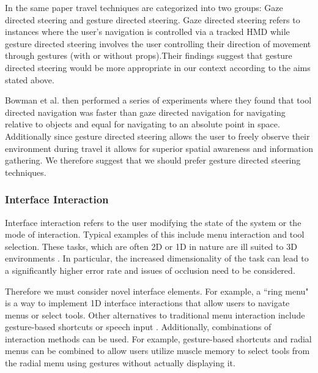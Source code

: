 \documentclass{sig-alternate-05-2015}
\begin{document}
In the same paper travel techniques are categorized into two groups: Gaze directed steering and gesture directed steering\cite{Bowman1997}. Gaze directed steering refers to instances where the user's navigation is controlled via a tracked HMD while gesture directed  steering involves the user controlling their direction of movement through gestures (with or without props).Their findings suggest that gesture directed steering would be more appropriate in our context according to the aims stated above.

Bowman et al. then performed a series of experiments where they found that tool directed navigation was faster than gaze directed navigation for navigating relative to objects and equal for navigating to an absolute point in space. Additionally since gesture directed steering allows the user to freely observe their environment during travel it allows for superior spatial awareness and information gathering. We therefore suggest that we should prefer gesture directed steering techniques.

\subsubsection{Interface Interaction}
Interface interaction refers to the user modifying the state of the system or the mode of interaction\cite{Bowman2001}. Typical examples of this include menu interaction and tool selection. These tasks, which are often 2D or 1D in nature are ill suited to 3D environments \cite{Bowman2001, Hand1997}. In particular, the increased dimensionality of the task can lead to a significantly higher error rate and issues of occlusion need to be considered\cite{Hand1997}.

Therefore we must consider novel interface elements. For example, a ``ring menu" is a way to implement 1D interface interactions that allow users to navigate menus or select tools\cite{Hand1997}. Other alternatives to traditional menu interaction include gesture-based shortcuts\cite{Zeleznik2007} or speech input \cite{VanDam1997,Bowman2001,Hand1997}. Additionally, combinations of interaction methods can be used. For example, gesture-based shortcuts and radial menus can be combined to allow users utilize muscle memory to select tools from the radial menu using gestures without actually displaying it.\cite{Kurtenbach1993}
\end{document}
